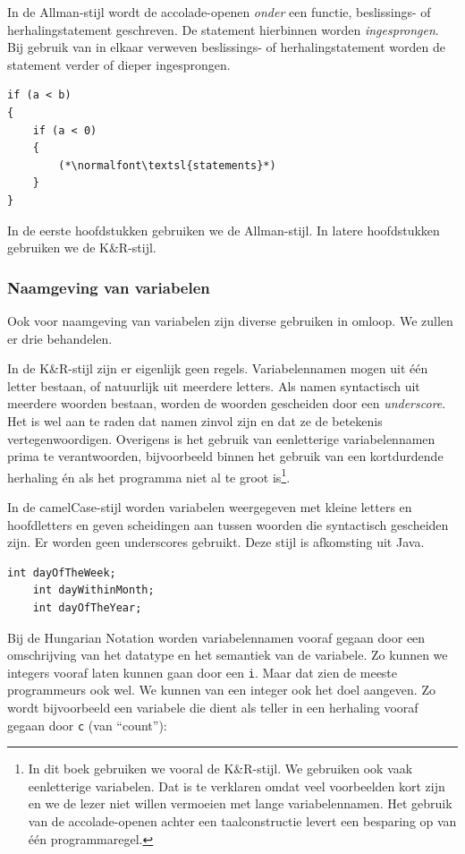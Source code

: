 In de Allman-stijl wordt de accolade-openen \textsl{onder} een functie, beslissings- of herhalingstatement geschreven. De statement hierbinnen worden \textsl{ingesprongen}. Bij gebruik van in elkaar verweven beslissings- of herhalingstatement worden de statement verder of dieper ingesprongen.

\begin{lstlisting}[caption=Allman-stijl.]
if (a < b)
{
    if (a < 0)
    {
        (*\normalfont\textsl{statements}*)
    }
}
\end{lstlisting}

In de eerste hoofdstukken gebruiken we de Allman-stijl. In latere hoofdstukken gebruiken we de K\&R-stijl.

\subsubsection*{Naamgeving van variabelen}

Ook voor naamgeving van variabelen zijn diverse gebruiken in omloop. We zullen er drie behandelen.

In de K\&R-stijl zijn er eigenlijk geen regels. Variabelennamen mogen uit één letter bestaan, of natuurlijk uit meerdere letters. Als namen syntactisch uit meerdere woorden bestaan, worden de woorden gescheiden door een \textsl{underscore}. Het is wel aan te raden dat namen zinvol zijn en dat ze de betekenis vertegenwoordigen. Overigens is het gebruik van eenletterige variabelennamen prima te verantwoorden, bijvoorbeeld binnen het gebruik van een kortdurdende herhaling én als het programma niet al te groot is\footnote{In dit boek gebruiken we vooral de K\&R-stijl. We gebruiken ook vaak eenletterige variabelen. Dat is te verklaren omdat veel voorbeelden kort zijn en we de lezer niet willen vermoeien met lange variabelennamen. Het gebruik van de accolade-openen achter een taalconstructie levert een besparing op van één programmaregel.}.

In de camelCase-stijl worden variabelen weergegeven met kleine letters en hoofdletters en geven scheidingen aan tussen woorden die syntactisch gescheiden zijn. Er worden geen underscores gebruikt. Deze stijl is afkomsting uit Java.

\begin{lstlisting}[caption=camelCase-stijl.]
    int dayOfTheWeek;
    int dayWithinMonth;
    int dayOfTheYear;
\end{lstlisting}

Bij de Hungarian Notation worden variabelennamen vooraf gegaan door een omschrijving van het datatype en het semantiek van de variabele. Zo kunnen we integers vooraf laten kunnen gaan door een \lstinline|i|. Maar dat zien de meeste programmeurs ook wel. We kunnen van een integer ook het doel aangeven. Zo wordt bijvoorbeeld een variabele die dient als teller in een herhaling vooraf gegaan door \lstinline|c| (van ``count''):

